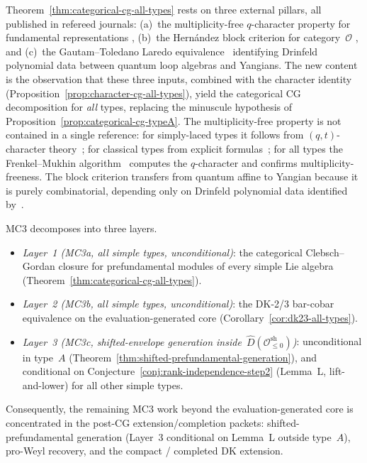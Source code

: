 \begin{remark}
\label{rem:categorical-cg-external-inputs}
Theorem~\ref{thm:categorical-cg-all-types} rests on three
external pillars, all published in refereed journals:
\textup{(a)}~the multiplicity-free $q$-character property
for fundamental representations
\cite{Nakajima04, FrenkelMukhin01, ChariMoura06},
\textup{(b)}~the Hern\'andez block
criterion for category~$\mathcal{O}$
\cite{Hernandez05, HJZ25}, and \textup{(c)}~the
Gautam--Toledano Laredo equivalence~\cite{GTL17}
identifying Drinfeld polynomial data between quantum
loop algebras and Yangians.
The new content is the observation
that these three inputs, combined with the character identity
(Proposition~\ref{prop:character-cg-all-types}), yield the
categorical CG decomposition for \emph{all} types, replacing
the minuscule hypothesis of
Proposition~\ref{prop:categorical-cg-typeA}.
The multiplicity-free property is not contained in a single
reference: for simply-laced types it follows from
$(q,t)$-character theory~\cite{Nakajima04}; for classical types
from explicit formulas~\cite{ChariMoura06}; for all types the
Frenkel--Mukhin algorithm~\cite{FrenkelMukhin01} computes the
$q$-character and confirms multiplicity-freeness.
The block criterion transfers from quantum affine to Yangian
because it is purely combinatorial, depending only on Drinfeld
polynomial data identified by~\cite{GTL17}.
\end{remark}

\begin{corollary}
\label{cor:mc3-all-types}%
%
MC3 decomposes into three layers.
\begin{itemize}
\item \emph{Layer~1 \textup{(}MC3a, all simple types,
 unconditional\textup{)}}: the categorical Clebsch--Gordan closure
 for prefundamental modules of every simple Lie algebra
 \textup{(}Theorem~\textup{\ref{thm:categorical-cg-all-types}}\textup{)}.
\item \emph{Layer~2 \textup{(}MC3b, all simple types,
 unconditional\textup{)}}: the DK-2/3 bar-cobar equivalence on the
 evaluation-generated core
 \textup{(}Corollary~\textup{\ref{cor:dk23-all-types}}\textup{)}.
\item \emph{Layer~3 \textup{(}MC3c, shifted-envelope generation
 inside~$\widehat{D}(\mathcal{O}^{\mathrm{sh}}_{\leq 0})$\textup{)}}:
 unconditional in type~$A$
 \textup{(}Theorem~\textup{\ref{thm:shifted-prefundamental-generation}}\textup{)},
 and conditional on Conjecture~\textup{\ref{conj:rank-independence-step2}}
 \textup{(}Lemma~L, lift-and-lower\textup{)} for all other simple
 types.
\end{itemize}
Consequently, the remaining MC3 work beyond the evaluation-generated
core is concentrated in the post-CG extension/completion packets:
shifted-prefundamental generation \textup{(}Layer~3 conditional on
Lemma~L outside type~$A$\textup{)}, pro-Weyl recovery, and the
compact / completed DK extension.
\end{corollary}

